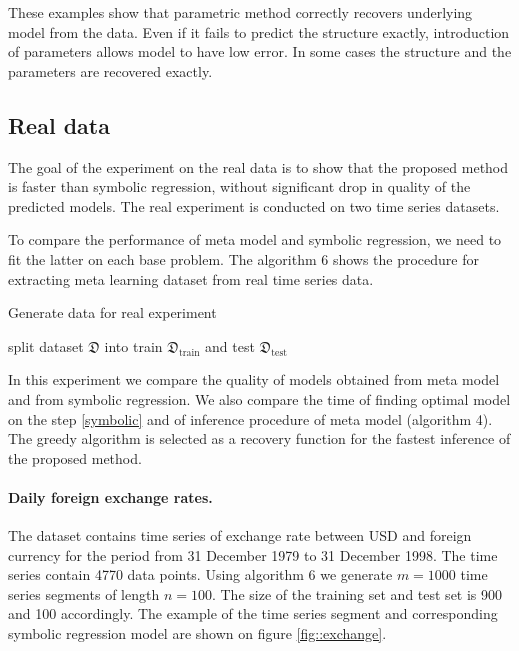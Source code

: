 \documentclass[12pt]{article}
\let\originalparagraph\paragraph
\renewcommand{\paragraph}[2][.]{\originalparagraph{#2#1}}
\begin{document}
These examples show that parametric method correctly recovers underlying model from the data.
Even if it fails to predict the structure exactly, introduction of parameters allows model to have low error.
In some cases the structure and the parameters are recovered exactly.

\subsection{Real data}
The goal of the experiment on the real data is to show that the proposed method is faster than symbolic regression, without significant drop in quality of the predicted models.
The real experiment is conducted on two time series datasets.

To compare the performance of meta model and symbolic regression, we need to fit the latter on each base problem.
The algorithm 6 shows the procedure for extracting meta learning dataset from real time series data.

\begin{algorithm}[!ht]
\caption{Generate data for real experiment}
  split dataset $\mathfrak{D}$ into train $\mathfrak{D}_\text{train}$ and test $\mathfrak{D}_\text{test}$\;
\end{algorithm}

In this experiment we compare the quality of models obtained from meta model and from symbolic regression.
We also compare the time of finding optimal model on the step \ref{symbolic} and of inference procedure of meta model (algorithm 4).
The greedy algorithm is selected as a recovery function for the fastest inference of the proposed method.

\paragraph{Daily foreign exchange rates}
The dataset \cite{exchange-rates} contains time series of exchange rate between USD and foreign currency for the period from 31 December 1979 to 31 December 1998.
The time series contain 4770 data points.
Using algorithm 6 we generate $m=1000$ time series segments of length $n=100$. The size of the training set and test set is 900 and 100 accordingly.
The example of the time series segment and corresponding symbolic regression model are shown on figure \ref{fig::exchange}.
\end{document}
